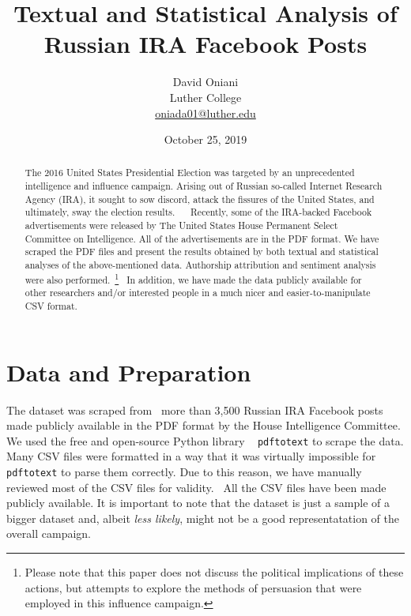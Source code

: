 \documentclass[12pt]{article}
\author{David Oniani\\
        Luther College\\
        \href{mailto:oniada01@luther.edu}{oniada01@luther.edu}}
\title{\textbf{Textual and Statistical Analysis of Russian IRA Facebook Posts}}
\date{October 25, 2019}
\theoremstyle{definition}
\begin{document}
\maketitle


\begin{abstract}

\noindent The 2016 United States Presidential Election was targeted by an
unprecedented intelligence and influence campaign. Arising out of Russian
so-called Internet Research Agency (IRA), it sought to sow discord, attack
the fissures of the United States, and ultimately, sway the election results.
~\cite{ira2016}~\cite{ira2016data} Recently, some of the IRA-backed Facebook
advertisements were released by The United States House Permanent Select
Committee on Intelligence. All of the advertisements are in the PDF format. We
have scraped the PDF files and present the results obtained by both textual and
statistical analyses of the above-mentioned data. Authorship attribution and
sentiment analysis were also performed.~\footnote{Please note that this paper
does not discuss the political implications of these actions, but attempts to
explore the methods of persuasion that were employed in this influence
campaign.}~\cite{ira2016csvdata} In addition, we have made the data publicly
available for other researchers and/or interested people in a much nicer and
easier-to-manipulate CSV format.
\end{abstract}


\newpage
\tableofcontents
\newpage


\section*{\centering Data and Preparation}

The dataset was scraped from~\cite{ira2016data} more than 3,500 Russian IRA
Facebook posts made publicly available in the PDF format by the House
Intelligence Committee. We used the free and open-source Python library
~\cite{pdftotext} \texttt{pdftotext} to scrape the data. Many CSV files were
formatted in a way that it was virtually impossible for \texttt{pdftotext} to
parse them correctly. Due to this reason, we have manually reviewed most of the
CSV files for validity.~\cite{ira2016csvdata} All the CSV files have been made
publicly available. It is important to note that the dataset is just a sample
of a bigger dataset and, albeit \textit{less likely}, might not be a good
representatation of the overall campaign.
\end{document}
